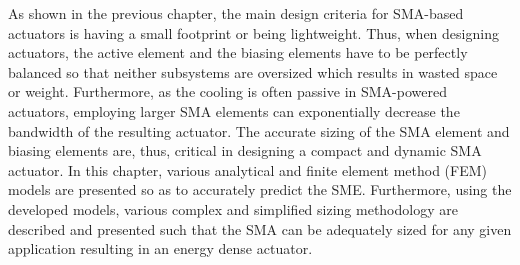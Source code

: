 As shown in the previous chapter, the main design criteria for SMA-based actuators is having a small footprint or being lightweight. Thus, when designing actuators, the active element and the biasing elements have to be perfectly balanced so that neither subsystems are oversized which results in wasted space or weight. Furthermore, as the cooling is often passive in SMA-powered actuators, employing larger SMA elements can exponentially decrease the bandwidth of the resulting actuator. The accurate sizing of the SMA element and biasing elements are, thus, critical in designing a compact and dynamic SMA actuator. In this chapter, various analytical and finite element method (FEM) models are presented so as to accurately predict the SME. Furthermore, using the developed models, various complex and simplified sizing methodology are described and presented such that the SMA can be adequately sized for any given application resulting in an energy dense actuator.

